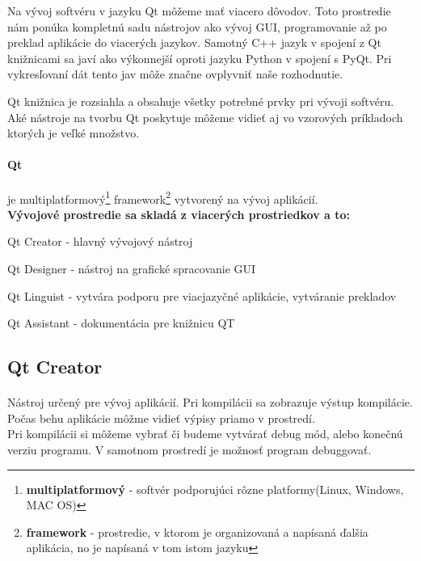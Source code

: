 Na vývoj softvéru v jazyku Qt môžeme mať viacero dôvodov. Toto prostredie nám ponúka kompletnú sadu nástrojov ako vývoj GUI, programovanie až po preklad aplikácie do viacerých jazykov. Samotný C++ jazyk v spojení z Qt knižnicami sa javí ako výkonnejší oproti jazyku Python v spojení s PyQt. Pri vykresľovaní dát tento jav môže značne ovplyvniť naše rozhodnutie.

Qt knižnica je rozsiahla a obsahuje všetky potrebné prvky pri vývoji softvéru. Aké nástroje na tvorbu Qt poskytuje môžeme vidieť aj vo vzorových príkladoch ktorých je veľké množstvo.\\


\paragraph{Qt} je multiplatformový\footnote{\textbf{multiplatformový} - softvér podporujúci rôzne platformy(Linux, Windows, MAC OS)} framework\footnote{\textbf{framework} - prostredie, v ktorom je organizovaná a napísaná ďalšia aplikácia, no je napísaná v tom istom jazyku} vytvorený na vývoj aplikácií.\\

\textbf{Vývojové prostredie sa skladá z viacerých prostriedkov a to:}
\begin{list}{•}
\item Qt Creator - hlavný vývojový nástroj
\item
\item Qt Designer - nástroj na grafické spracovanie GUI
\item Qt Linguist - vytvára podporu pre viacjazyčné aplikácie, vytváranie prekladov
\item Qt Assistant - dokumentácia pre knižnicu QT 
\end{list}

\subsection{Qt Creator}
\paragraph{} Nástroj určený pre vývoj aplikácií. 
Pri kompilácii sa zobrazuje výstup kompilácie. Počas behu aplikácie môžme vidieť výpisy priamo v prostredí.\\
Pri kompilácii si môžeme vybrať či budeme vytvárať debug mód, alebo konečnú
verziu programu. V samotnom prostredí je možnosť program debuggovať.

